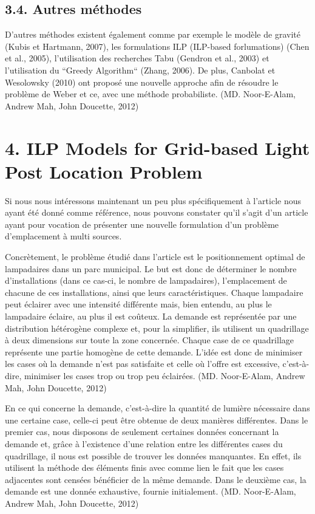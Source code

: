 \subsection*{3.4. Autres méthodes}

\bigskip

D'autres méthodes existent également comme par exemple le modèle de gravité (Kubis et Hartmann, 2007), les formulations ILP (ILP-based forlumations) (Chen et al., 2005), l'utilisation des recherches Tabu (Gendron et al., 2003) et l'utilisation du ``Greedy Algorithm`` (Zhang, 2006). De plus, Canbolat et Wesolowsky (2010) ont proposé une nouvelle approche afin de résoudre le problème de Weber et ce, avec une méthode probabiliste. (MD. Noor-E-Alam, Andrew Mah, John Doucette, 2012)

\section*{4. ILP Models for Grid-based Light Post Location Problem}

\bigskip

Si nous nous intéressons maintenant un peu plus spécifiquement à l'article nous ayant été donné comme référence, nous pouvons constater qu'il s'agit d'un article ayant pour vocation de présenter une nouvelle formulation d'un problème d'emplacement à multi sources. 

\bigskip

Concrètement, le problème étudié dans l'article est le positionnement optimal de lampadaires dans un parc municipal. 
Le but est donc de déterminer le nombre d'installations (dans ce cas-ci, le nombre de lampadaires), l'emplacement de chacune de ces installations, ainsi que leurs caractéristiques. Chaque lampadaire peut éclairer avec une intensité différente mais, bien entendu, au plus le lampadaire éclaire, au plus il est coûteux. 
La demande est représentée par une distribution hétérogène complexe et, pour la simplifier, ils utilisent un quadrillage à deux dimensions sur toute la zone concernée. Chaque case de ce quadrillage représente une partie homogène de cette demande. L'idée est donc de minimiser les cases où la demande n'est pas satisfaite et celle où l'offre est excessive, c'est-à-dire, minimiser les cases trop ou trop peu éclairées. (MD. Noor-E-Alam, Andrew Mah, John Doucette, 2012)

\bigskip

En ce qui concerne la demande, c'est-à-dire la quantité de lumière nécessaire dans une certaine case, celle-ci peut être obtenue de deux manières différentes. Dans le premier cas, nous disposons de seulement certaines données concernant la demande et, grâce à l'existence d'une relation entre les différentes cases du quadrillage, il nous est possible de trouver les données manquantes. En effet, ils utilisent la méthode des éléments finis avec comme lien le fait que les cases adjacentes sont censées  bénéficier de la même demande. Dans le deuxième cas, la demande est une donnée exhaustive, fournie initialement. (MD. Noor-E-Alam, Andrew Mah, John Doucette, 2012)

